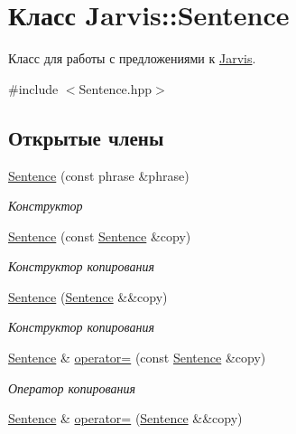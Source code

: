 \hypertarget{classJarvis_1_1Sentence}{}\section{Класс Jarvis\+:\+:Sentence}
\label{classJarvis_1_1Sentence}


Класс для работы с предложениями к \hyperlink{classJarvis_1_1Jarvis}{Jarvis}.  




{\ttfamily \#include $<$Sentence.\+hpp$>$}

\subsection*{Открытые члены}
\begin{DoxyCompactItemize}
\item 
\hyperlink{classJarvis_1_1Sentence_acc720056eaf5ae72302802c6ef694fcd}{Sentence} (const phrase \&phrase)
\begin{DoxyCompactList}\small\item\em Конструктор \end{DoxyCompactList}\item 
\hyperlink{classJarvis_1_1Sentence_a2cf95d90b62afeb1ba141157220b469d}{Sentence} (const \hyperlink{classJarvis_1_1Sentence}{Sentence} \&copy)
\begin{DoxyCompactList}\small\item\em Конструктор копирования \end{DoxyCompactList}\item 
\hyperlink{classJarvis_1_1Sentence_af852c6a73ee0411f4c0f78ed68f97bd3}{Sentence} (\hyperlink{classJarvis_1_1Sentence}{Sentence} \&\&copy)
\begin{DoxyCompactList}\small\item\em Конструктор копирования \end{DoxyCompactList}\item 
\hyperlink{classJarvis_1_1Sentence}{Sentence} \& \hyperlink{classJarvis_1_1Sentence_a023e7f01ec0e27b0451206c1be002fda}{operator=} (const \hyperlink{classJarvis_1_1Sentence}{Sentence} \&copy)
\begin{DoxyCompactList}\small\item\em Оператор копирования \end{DoxyCompactList}\item 
\hyperlink{classJarvis_1_1Sentence}{Sentence} \& \hyperlink{classJarvis_1_1Sentence_a5f9db983639fc70219bf1a55033fe5ed}{operator=} (\hyperlink{classJarvis_1_1Sentence}{Sentence} \&\&copy)

\end{DoxyCompactItemize}
